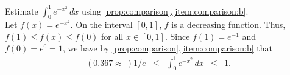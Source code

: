 \documentclass{book}
\newcommand{\dx}{\,dx}
\newcommand{\dint}{\displaystyle \int}
\begin{document}
\begin{Exam} Estimate $\dint_0^1 e^{-x^2}\dx$ using \ref{prop:comparison}.\ref{item:comparison:b}.\\

Let $f(x) = e^{-x^2}$. On the interval $[0,1]$, $f$ is a decreasing function. Thus, $f(1) \le f(x) \le f(0)$ for all $x\in [0,1]$. Since $f(1) = e^{-1}$ and $f(0) = e^{0} = 1$, we have by \ref{prop:comparison}.\ref{item:comparison:b} that 
\[\begin{alignedat}{100}
(0.367 \approx\ ) 1/e &\le& \int_0^1 e^{-x^2}\dx &\le& 1.\end{alignedat} \] 
\end{Exam}\vs

\vfill
{}
\pagebreak
\end{document}

